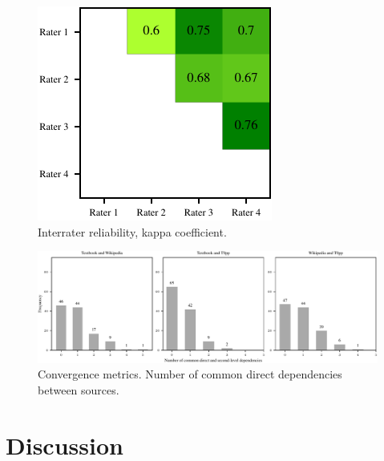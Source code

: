 \documentclass{article}
\begin{document}
\begin{figure}[H]
    \centering
    \includegraphics[width=.4\textwidth]{img/kappa.pdf}
    \caption{Interrater reliability, kappa coefficient.}
    \label{fig:kappa}
\end{figure}


\begin{figure}
    \centering
    \includegraphics[width=.95\textwidth]{img/comp_direct_deps.pdf}
    \caption{Convergence metrics. Number of common direct dependencies between sources.}
    \label{fig:comp_direct_deps}
\end{figure}

\section{Discussion}



\end{document}
